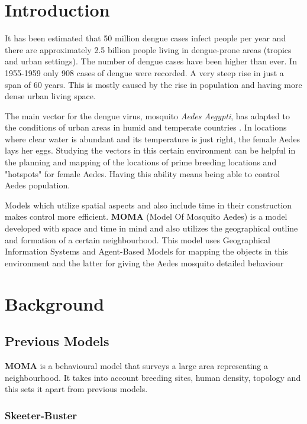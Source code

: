 \section{Introduction}

It has been estimated that 50 million dengue cases infect people per year and there are approximately 2.5 billion people living in dengue-prone areas (tropics and urban settings). The number of dengue cases have been higher than ever. In 1955-1959 only 908 cases of dengue were recorded. A very steep rise in just a span of 60 years\cite{who:dengue}. This is mostly caused by the rise in population and having more dense urban living space.

The main vector for the dengue virus, mosquito \textit{Aedes Aegypti}, has adapted to the conditions of urban areas in humid and temperate countries \cite{descloux,carlos}. In locations where clear water is abundant and its temperature is just right, the female Aedes lays her eggs. Studying the vectors in this certain environment can be helpful in the planning and mapping of the locations of prime breeding locations and "hotspots" for female Aedes\cite{who:dengue}. Having this ability means being able to control Aedes population.

Models which utilize spatial aspects and also include time in their construction makes control more efficient. \textbf{MOMA} (Model Of Mosquito Aedes) is a model developed with space and time in mind and also utilizes the geographical outline and formation of a certain neighbourhood. This model uses Geographical Information Systems and Agent-Based Models for mapping the objects in this environment and the latter for giving the Aedes mosquito detailed behaviour

\section{Background}



\subsection{Previous Models}

\textbf{MOMA} is a behavioural model that surveys a large area representing a neighbourhood. It takes into account breeding sites\cite{skeeter,carlos}, human density, topology and this sets it apart from previous models.

\subsubsection{Skeeter-Buster} 

